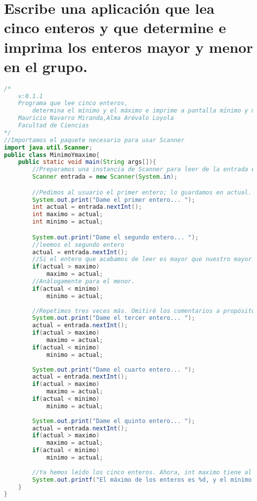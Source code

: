 \documentclass[a4paper]{article}
\begin{document}
\newpage
\section{Escribe una aplicación que lea cinco enteros y que determine e imprima los enteros mayor y menor en el grupo.}
\begin{lstlisting}[language=JAVA]
/*
    v:0.1.1
    Programa que lee cinco enteros,
        determina el mínimo y el máximo e imprime a pantalla mínimo y máximo.
    Mauricio Navarro Miranda,Alma Arévalo Loyola
    Facultad de Ciencias
*/
//Importamos el paquete necesario para usar Scanner
import java.util.Scanner;
public class MinimoYmaximo{
    public static void main(String args[]){
        //Preparamos una instancia de Scanner para leer de la entrada estándar
        Scanner entrada = new Scanner(System.in);

        //Pedimos al usuario el primer entero; lo guardamos en actual. Notemos que éste es, hasta ahora, el máximo el mínimo.
        System.out.print("Dame el primer entero... ");
        int actual = entrada.nextInt();
        int maximo = actual;
        int minimo = actual;

        System.out.print("Dame el segundo entero... ");
        //leemos el segundo entero
        actual = entrada.nextInt();
        //Si el entero que acabamos de leer es mayor que nuestro mayor almacenado, actualizamos mayor.
        if(actual > maximo)
            maximo = actual;
        //Análogamente para el menor.
        if(actual < minimo)
            minimo = actual;
    
        //Repetimos tres veces más. Omitiré los comentarios a propósito.
        System.out.print("Dame el tercer entero... ");
        actual = entrada.nextInt();
        if(actual > maximo)
            maximo = actual;
        if(actual < minimo)
            minimo = actual;
 
        System.out.print("Dame el cuarto entero... ");
        actual = entrada.nextInt();
        if(actual > maximo)
            maximo = actual;
        if(actual < minimo)
            minimo = actual;
   
        System.out.print("Dame el quinto entero... ");
        actual = entrada.nextInt();
        if(actual > maximo)
            maximo = actual;
        if(actual < minimo)
            minimo = actual;
    
        //Ya hemos leído los cinco enteros. Ahora, int maximo tiene al máximo de ellos, mientras que el mínimo está en int minimo.
        System.out.printf("El máximo de los enteros es %d, y el mínimo es %d\n", maximo, minimo);
    }
}
\end{lstlisting}
\end{document}
